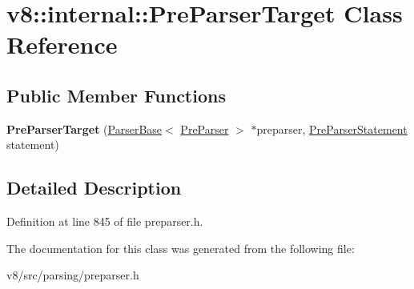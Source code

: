 \hypertarget{classv8_1_1internal_1_1PreParserTarget}{}\section{v8\+:\+:internal\+:\+:Pre\+Parser\+Target Class Reference}
\label{classv8_1_1internal_1_1PreParserTarget}
\subsection*{Public Member Functions}
\begin{DoxyCompactItemize}
\item 
\mbox{\label{classv8_1_1internal_1_1PreParserTarget_a01462c1b181e2288f076dbd53658a9b1}} 
{\bfseries Pre\+Parser\+Target} (\mbox{\hyperlink{classv8_1_1internal_1_1ParserBase}{Parser\+Base}}$<$ \mbox{\hyperlink{classv8_1_1internal_1_1PreParser}{Pre\+Parser}} $>$ $\ast$preparser, \mbox{\hyperlink{classv8_1_1internal_1_1PreParserStatement}{Pre\+Parser\+Statement}} statement)
\end{DoxyCompactItemize}


\subsection{Detailed Description}


Definition at line 845 of file preparser.\+h.



The documentation for this class was generated from the following file\+:\begin{DoxyCompactItemize}
\item 
v8/src/parsing/preparser.\+h\end{DoxyCompactItemize}
